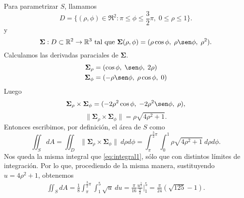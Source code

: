 \begin{solution}
    Para parametrizar $S$, llamamos
    \[
        D = \{(\rho, \phi)\in\Re^2 : \pi\leq\phi\leq\frac{3}{2}\pi,\;
        0\leq\rho\leq 1\}.
    \]
    y
    \[
        \boldsymbol{\Sigma}:D\subset\Re^2\rightarrow\Re^3\text{ tal que }
        \boldsymbol{\Sigma}(\rho,\phi)=(\rho\cos\phi,\;\rho\sen\phi,\;\rho^2).
    \]
    Calculamos las derivadas paraciales de $\boldsymbol{\Sigma}$.
    \begin{align*}
        \boldsymbol{\Sigma}_{\rho}&=(\cos \phi,\;\sen \phi,\; 2\rho)\\
        \boldsymbol{\Sigma}_\phi&=(  -\rho \sen \phi,\;\rho \cos \phi,\;0)
        \end{align*}
    Luego
    $$
        \boldsymbol{\Sigma}_{\rho} \times\boldsymbol{\Sigma}_\phi =
        (-2\rho^2 \cos\phi  , \;-2\rho^2 \sen \phi, \;\rho),
    $$ 
    $$\|\boldsymbol{\Sigma}_{\rho} \times\boldsymbol{\Sigma}_\phi\|
        = \rho\sqrt{4\rho^2+1}.
    $$ 
    Entonces escribimos, por definici\'on, el \'area de $S$ como
    \[
        \iint_S dA = \iint_D \| \boldsymbol{\Sigma}_{\rho}
        \times\boldsymbol{\Sigma}_\phi\|\:d\rho d\phi = \int_\pi^{\frac{3}{2}\pi}\int_0^1\rho\sqrt{4\rho^2+1}\:d\rho d\phi.
    \]
    Nos queda la misma integral que \eqref{eq:integral1}, s\'olo que con distintos l\'imites de integraci\'on. Por lo que, procediendo de la misma manera, sustituyendo $u = 4\rho^2+1$, obtenemos
    \begin{gather*}
        \iint_S dA =
        \frac{1}{8}\int_\pi^{\frac{3}{2}\pi}\int_1^5\sqrt{u}\:du =
        \frac{\pi}{16}\frac{u^{\frac{3}{2}}}{\frac{3}{2}}\Bigg\lvert_1^5 =
        \frac{\pi}{24}(\sqrt{125}-1).
    \end{gather*}
\end{solution}


